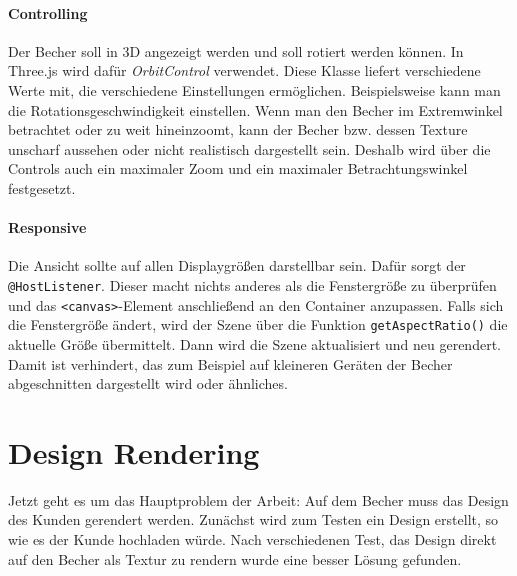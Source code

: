 \paragraph{Controlling}
Der Becher soll in 3D angezeigt werden und soll rotiert werden können. In Three.js wird dafür \textit{OrbitControl} verwendet. Diese Klasse liefert verschiedene Werte mit, die verschiedene Einstellungen ermöglichen. Beispielsweise kann man die Rotationsgeschwindigkeit einstellen. Wenn man den Becher im Extremwinkel betrachtet oder zu weit hineinzoomt, kann der Becher bzw. dessen Texture unscharf aussehen oder nicht realistisch dargestellt sein. Deshalb wird über die Controls auch ein maximaler Zoom und ein maximaler Betrachtungswinkel festgesetzt.
\paragraph{Responsive} Die Ansicht sollte auf allen Displaygrößen darstellbar sein. Dafür sorgt der \texttt{@HostListener}. Dieser macht nichts anderes als die Fenstergröße zu überprüfen und das \texttt{<canvas>}-Element anschließend an den Container anzupassen. Falls sich die Fenstergröße ändert, wird der Szene über die Funktion \texttt{getAspectRatio()} die aktuelle Größe übermittelt. Dann wird die Szene aktualisiert und neu gerendert. Damit ist verhindert, das zum Beispiel auf kleineren Geräten der Becher abgeschnitten dargestellt wird oder ähnliches.
%
\section{Design Rendering}
\label{sec:umsetzung}
%
Jetzt geht es um das Hauptproblem der Arbeit: Auf dem Becher muss das Design des Kunden gerendert werden. Zunächst wird zum Testen ein Design erstellt, so wie es der Kunde hochladen würde. Nach verschiedenen Test, das Design direkt auf den Becher als Textur zu rendern wurde eine besser Lösung gefunden. 
